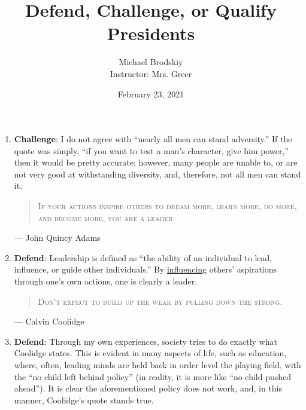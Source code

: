 \documentclass[12pt]{article}
\title{Defend, Challenge, or Qualify Presidents}
\date{February 23, 2021}
\author{Michael Brodskiy\\ \small Instructor: Mrs. Greer}
\begin{document}
    \maketitle

    \begin{enumerate}

        \hline

        \begin{quote}
          \textsc{Nearly all men can stand adversity, but if you want to test a man's character, give him power.} 
        \end{quote} \vspace{-10pt}\hspace{325pt}— Abraham Lincoln

      \item \textbf{Challenge}: I do not agree with “nearly all men can stand adversity.” If the quote was simply, “if you want to test a man's character, give him power,” then it would be pretty accurate; however, many people are unable to, or are not very good at withstanding diversity, and, therefore, not all men can stand it.

        \vspace{10pt}
        \hline

        \begin{quote}
          \textsc{If your actions inspire others to dream more, learn more, do more, and become more, you are a leader.} 
        \end{quote} \vspace{-10pt}\hspace{325pt}— John Quincy Adams

      \item \textbf{Defend}: Leadership is defined as “the ability of an individual to lead, influence, or guide other individuals.” By \underline{influencing} others' aspirations through one's own actions, one is clearly a leader.

        \vspace{10pt}
        \hline

        \begin{quote}
          \textsc{Don't expect to build up the weak by pulling down the strong.} 
        \end{quote} \hspace{325pt}— Calvin Coolidge

      \item \textbf{Defend}: Through my own experiences, society tries to do exactly what Coolidge states. This is evident in many aspects of life, such as education, where, often, leading minds are held back in order level the playing field, with the “no child left behind policy” (in reality, it is more like “no child pushed ahead”). It is clear the aforementioned policy does not work, and, in this manner, Coolidge's quote stands true.


\end{enumerate}
\end{document}
